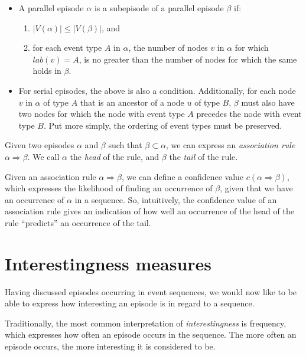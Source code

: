 \begin{itemize}
\item A parallel episode $ \alpha $ is a subepisode of a parallel episode $ \beta $ if:
\begin{enumerate}
\item $ | V(\alpha) | \leq | V(\beta) | $, and
\item for each event type $ A $ in $ \alpha $, the number of nodes $ v $ in $ \alpha $ for which $ lab(v) = A $, is no greater than the number of nodes for which the same holds in $ \beta $.
\end{enumerate}
\item For serial episodes, the above is also a condition. Additionally, for each node $ v $ in $ \alpha $ of type $ A $ that is an ancestor of a node $ u $ of type $ B $, $ \beta $ must also have two nodes for which the node with event type $ A $ precedes the node with event type $ B $. Put more simply, the ordering of event types must be preserved.
\end{itemize}

\begin{definition}
Given two episodes $ \alpha $ and $ \beta $ such that $ \beta \subset \alpha $, we can express an \emph{association rule} $ \alpha \Rightarrow \beta $. We call $ \alpha $ the \emph{head} of the rule, and $ \beta $ the \emph{tail} of the rule.
\end{definition}

Given an association rule $ \alpha \Rightarrow \beta $, we can define a confidence value $ c(\alpha \Rightarrow \beta) $, which expresses the likelihood of finding an occurrence of $ \beta $, given that we have an occurrence of $ \alpha $ in a sequence. So, intuitively, the confidence value of an association rule gives an indication of how well an occurrence of the head of the rule ``predicts'' an occurrence of the tail.

\section{Interestingness measures}

Having discussed episodes occurring in event sequences, we would now like to be able to express how interesting an episode is in regard to a sequence.

Traditionally, the most common interpretation of \emph{interestingness} is frequency, which expresses how often an episode occurs in the sequence. The more often an episode occurs, the more interesting it is considered to be.

